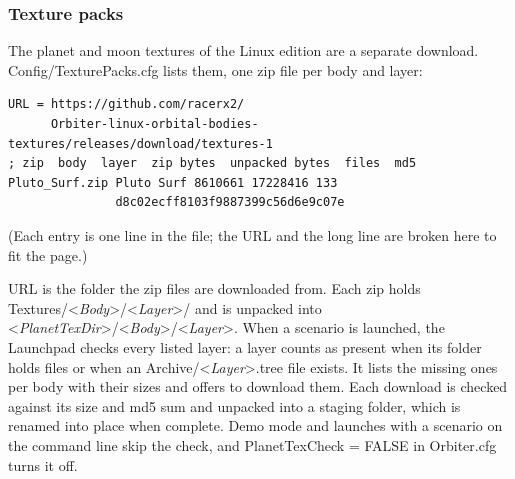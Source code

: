 \documentclass[Orbiter Developer Manual.tex]{subfiles}
\begin{document}
\subsubsection{Texture packs}
The planet and moon textures of the Linux edition are a separate download. Config/TexturePacks.cfg lists them, one zip file per body and layer:

\begin{lstlisting}[language=OSFS]
URL = https://github.com/racerx2/
      Orbiter-linux-orbital-bodies-textures/releases/download/textures-1
; zip  body  layer  zip bytes  unpacked bytes  files  md5
Pluto_Surf.zip Pluto Surf 8610661 17228416 133
               d8c02ecff8103f9887399c56d6e9c07e
\end{lstlisting}

\noindent
(Each entry is one line in the file; the URL and the long line are broken here to fit the page.)

\noindent
URL is the folder the zip files are downloaded from. Each zip holds Textures/<\textit{Body}>/<\textit{Layer}>/ and is unpacked into <\textit{PlanetTexDir}>/<\textit{Body}>/<\textit{Layer}>. When a scenario is launched, the Launchpad checks every listed layer: a layer counts as present when its folder holds files or when an Archive/<\textit{Layer}>.tree file exists. It lists the missing ones per body with their sizes and offers to download them. Each download is checked against its size and md5 sum and unpacked into a staging folder, which is renamed into place when complete. Demo mode and launches with a scenario on the command line skip the check, and PlanetTexCheck = FALSE in Orbiter.cfg turns it off.
\end{document}

